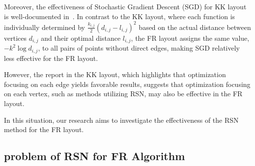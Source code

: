 \documentclass[dvipdfmx,journal]{IEEEtran}
\begin{document}
Moreover, the effectiveness of Stochastic Gradient Descent (SGD) for KK layout is well-documented in~\cite{8419285}.
In contrast to the KK layout, where each function is individually determined by $\frac{k_{i,j}}{2}(d_{i,j}-l_{i,j})^2$ based on the actual distance between vertices $d_{i,j}$ and their optimal distance $l_{i,j}$, the FR layout assigns the same value, $-k^2\log{d_{i,j}}$, to all pairs of points without direct edges, making SGD relatively less effective for the FR layout.

However, the report in the KK layout, which highlights that optimization focusing on each edge yields favorable results, suggests that optimization focusing on each vertex, such as methods utilizing RSN, may also be effective in the FR layout.

In this situation, our research aims to investigate the effectiveness of the RSN method for the FR layout.

\subsection{problem of RSN for FR Algorithm}
\end{document}
